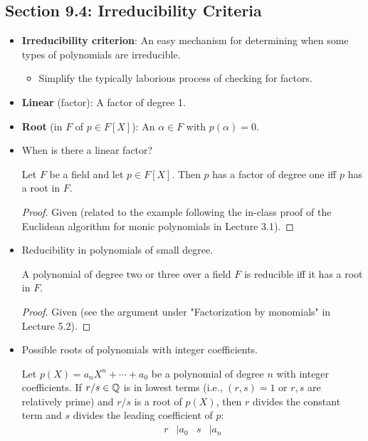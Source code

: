 \documentclass[../notes.tex]{subfiles}
\begin{document}
\subsection*{Section 9.4: Irreducibility Criteria}
\begin{itemize}
    \item \textbf{Irreducibility criterion}: An easy mechanism for determining when some types of polynomials are irreducible.
    \begin{itemize}
        \item Simplify the typically laborious process of checking for factors.
    \end{itemize}
    \item \textbf{Linear} (factor): A factor of degree 1.
    \item \textbf{Root} (in $F$ of $p\in F[X]$): An $\alpha\in F$ with $p(\alpha)=0$.
    \item When is there a linear factor?
    \begin{proposition}\label{prp:9.9}
        Let $F$ be a field and let $p\in F[X]$. Then $p$ has a factor of degree one iff $p$ has a root in $F$.
        \begin{proof}
            Given (related to the example following the in-class proof of the Euclidean algorithm for monic polynomials in Lecture 3.1).
        \end{proof}
    \end{proposition}
    \item Reducibility in polynomials of small degree.
    \begin{proposition}\label{prp:9.10}
        A polynomial of degree two or three over a field $F$ is reducible iff it has a root in $F$.
        \begin{proof}
            Given (see the argument under "Factorization by monomials" in Lecture 5.2).
        \end{proof}
    \end{proposition}
    \item Possible roots of polynomials with integer coefficients.
    \begin{proposition}\label{prp:9.11}
        Let $p(X)=a_nX^n+\cdots+a_0$ be a polynomial of degree $n$ with integer coefficients. If $r/s\in\mathbb{Q}$ is in lowest terms (i.e., $(r,s)=1$ or $r,s$ are relatively prime) and $r/s$ is a root of $p(X)$, then $r$ divides the constant term and $s$ divides the leading coefficient of $p$:
        \begin{align*}
            r &\mid a_0&
            s &\mid a_n

\end{align*}
\end{proposition}
\end{itemize}
\end{document}
